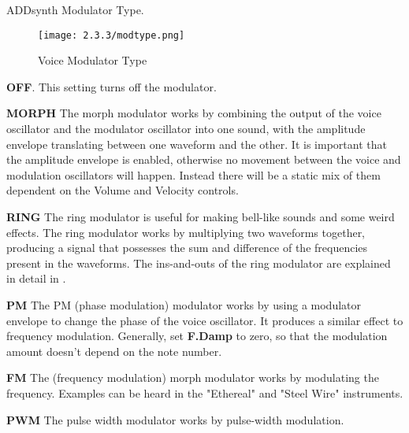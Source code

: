    \setcounter{ItemCounter}{0}      %

   ADDsynth Modulator Type.

\begin{figure}[H]
   \centering
     \texttt{[image: 2.3.3/modtype.png]}
   \caption{Voice Modulator Type}
   \label{fig:voice_modulator_type}
\end{figure}

   \begin{enumber}
      \item \textbf{OFF}.
         This setting turns off the modulator.
      \item \textbf{MORPH}
         The morph modulator works by combining the output of the voice oscillator
         and the modulator oscillator into one sound, with the amplitude envelope
         translating between one waveform and the other. It is important that the
         amplitude envelope is enabled, otherwise no movement between the voice and modulation oscillators will happen. Instead there will be a static mix of them dependent on the Volume and Velocity controls.

      \item \textbf{RING}
         The ring modulator is useful for making bell-like sounds and some
         weird effects.  The ring modulator works by multiplying two
         waveforms together, producing a signal that possesses the sum and
         difference of the frequencies present in the waveforms.  The
         ins-and-outs of the ring modulator are explained in detail in
         .
      \item \textbf{PM}
         The PM (phase modulation) modulator works by using a modulator
         envelope to change the phase of the voice oscillator. It produces a
         similar effect to frequency modulation.
         Generally, set \textbf{F.Damp} to zero, so that the modulation amount
         doesn't depend on the note number.
      \item \textbf{FM}
         The (frequency modulation) morph modulator works by modulating the
         frequency.  Examples can be heard in the "Ethereal" and "Steel Wire"
         instruments.
      \item \textbf{PWM}
         The pulse width modulator works by pulse-width modulation.
   \end{enumber}

